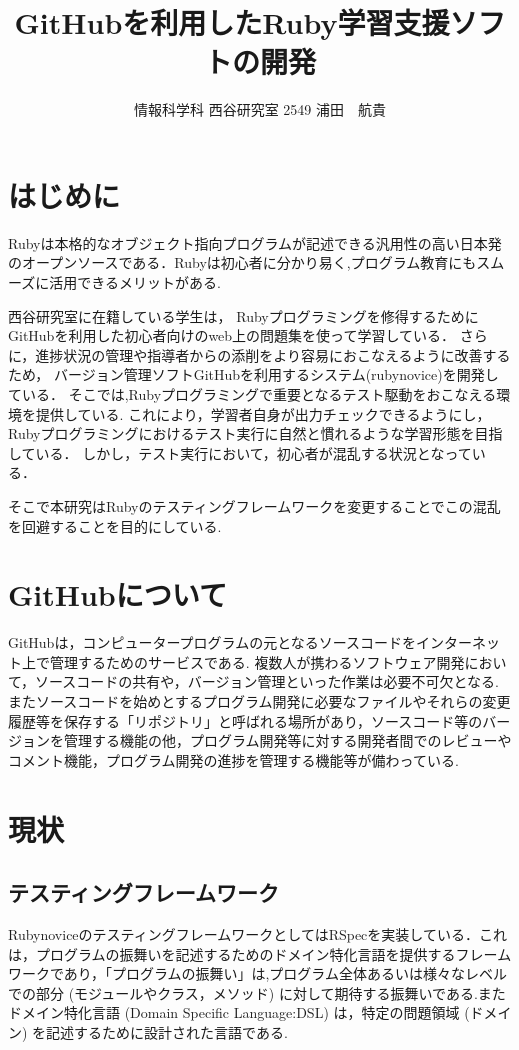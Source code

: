 \documentclass[a4j,twocolumn,uplatex]{jsarticle}
\begin{document}
\title{GitHubを利用したRuby学習支援ソフトの開発}
\author{情報科学科 西谷研究室 2549 浦田　航貴}
\date{}
\maketitle
\section{はじめに}
Rubyは本格的なオブジェクト指向プログラムが記述できる汎用性の高い日本発のオープンソースである．Rubyは初心者に分かり易く,プログラム教育にもスムーズに活用できるメリットがある\cite{1}.


西谷研究室に在籍している学生は，
Rubyプログラミングを修得するためにGitHubを利用した初心者向けのweb上の問題集を使って学習している．
さらに，進捗状況の管理や指導者からの添削をより容易におこなえるように改善するため，
バージョン管理ソフトGitHubを利用するシステム(rubynovice)を開発している．
そこでは,Rubyプログラミングで重要となるテスト駆動をおこなえる環境を提供している.
これにより，学習者自身が出力チェックできるようにし，
Rubyプログラミングにおけるテスト実行に自然と慣れるような学習形態を目指している．
しかし，テスト実行において，初心者が混乱する状況となっている．


そこで本研究はRubyのテスティングフレームワークを変更することでこの混乱を回避することを目的にしている.


\section{GitHubについて}
GitHubは，コンピュータープログラムの元となるソースコードをインターネット上で管理するためのサービスである.
複数人が携わるソフトウェア開発において，ソースコードの共有や，バージョン管理といった作業は必要不可欠となる.
またソースコードを始めとするプログラム開発に必要なファイルやそれらの変更履歴等を保存する「リポジトリ」と呼ばれる場所があり，ソースコード等のバージョンを管理する機能の他，プログラム開発等に対する開発者間でのレビューやコメント機能，プログラム開発の進捗を管理する機能等が備わっている\cite{2}.

\section{現状}
\subsection{テスティングフレームワーク}
RubynoviceのテスティングフレームワークとしてはRSpecを実装している．これは，プログラムの振舞いを記述するためのドメイン特化言語を提供するフレームワークであり，「プログラムの振舞い」は,プログラム全体あるいは様々なレベルでの部分 (モジュールやクラス，メソッド) に対して期待する振舞いである.またドメイン特化言語 (Domain Specific Language:DSL) は，特定の問題領域 (ドメイン) を記述するために設計された言語である\cite{3}.
\end{document}
